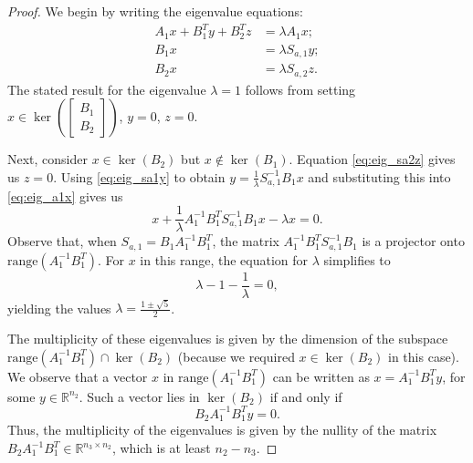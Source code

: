 \documentclass{article}
\newcommand{\range}{\mathrm{range}}
\begin{document}
\begin{proof}
    We begin by writing the eigenvalue equations:
    \begin{subequations}\label{eq:eig_blocktri_noreg_prec}
        \begin{align}
            A_1 x + B_1^T y + B_2^T z &= \lambda A_1 x; \label{eq:eig_a1x}\\ 
            B_1 x &= \lambda S_{a,1} y; \label{eq:eig_sa1y}\\ 
            B_2 x &= \lambda S_{a,2} z. \label{eq:eig_sa2z}
        \end{align}
    \end{subequations}
    The stated result for the eigenvalue $\lambda =1$ follows from setting $x \in \ker\left(\begin{bmatrix} B_1 \\ B_2 \end{bmatrix} \right)$, $y=0$, $z=0$.

    Next, consider $x \in \ker(B_2)$ but $x \notin \ker(B_1)$. Equation \eqref{eq:eig_sa2z} gives us $z=0$. Using \eqref{eq:eig_sa1y} to obtain $y = \frac{1}{\lambda}S_{a,1}^{-1}B_1x$ and substituting this into \eqref{eq:eig_a1x} gives us
    \[
    x + \frac{1}{\lambda} A_1^{-1}B_1^T S_{a,1}^{-1}B_1 x - \lambda x = 0.
    \]
    Observe that, when $S_{a,1} = B_1A_1^{-1}B_1^T$, the matrix $A_1^{-1}B_1^T S_{a,1}^{-1}B_1$ is a projector onto $\range(A_1^{-1}B_1^T)$.
    For $x$ in this range, the equation for $\lambda$ simplifies to
    \[
    \lambda - 1 - \frac{1}{\lambda} = 0,
    \]
    yielding the values $\lambda = \frac{1\pm \sqrt{5}}{2}$.

    The multiplicity of these eigenvalues is given by the dimension of the subspace $\range(A_1^{-1} B_1^T) \cap \ker(B_2)$ (because we required $x \in \ker(B_2)$ in this case). We observe that a vector $x$ in $\range(A_1^{-1} B_1^T)$ can be written as $x = A_1^{-1} B_1^Ty$, for some $y \in \mathbb{R}^{n_2}$. Such a vector lies in $\ker(B_2)$ if and only if
    \[
    B_2 A_1^{-1}B_1^T y = 0.
    \]
    Thus, the multiplicity of the eigenvalues is given by the nullity of the matrix \\ $B_2 A_1^{-1}B_1^T \in \mathbb{R}^{n_3 \times n_2}$, which is at least $n_2 - n_3$.
\end{proof}
\end{document}
